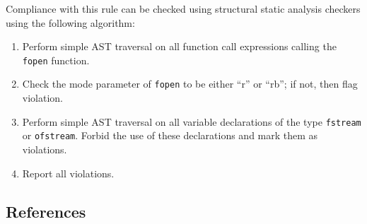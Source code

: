 Compliance with this rule can be checked using structural static analysis checkers using the following algorithm:

\begin{enumerate}
\item Perform simple AST traversal on all function call expressions calling the {\tt fopen} function.
\item Check the mode parameter of {\tt fopen} to be either ``r'' or ``rb''; if not, then flag violation.
\item Perform simple AST traversal on all variable declarations of the type {\tt fstream} or {\tt ofstream}. Forbid the use of these declarations and mark them as violations.
\item Report all violations. 
\end{enumerate}

\subsection{References}

